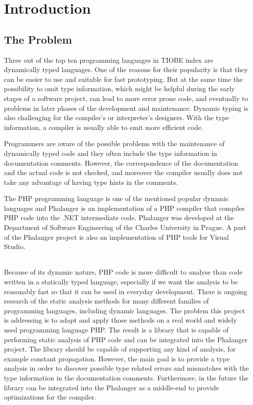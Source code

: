 \chapter{Introduction}

    \section{The Problem}
    
    Three out of the top ten programming languages in TIOBE index\cite{tiobe} 
    are dynamically typed languages. One of the reasons for their popularity 
    is that they can be easier to use and suitable for fast prototyping.
    But at the same time the possibility to omit type information, which might 
    be helpful during the early stages of a software project, can lead to more 
    error prone code, and eventually to problems in later phases of the 
    development and maintenance. Dynamic typing is also challenging for the 
    compiler's or interpreter's designers. With the type information, 
    a compiler is usually able to emit more efficient code.
    
    Programmers are aware of the possible problems with the maintenance of 
    dynamically typed code and they often include the type information in 
    documentation comments. However, the correspondence of the documentation 
    and the actual code is not checked, and moreover the compiler usually 
    does not take any advantage of having type hints in the comments.
    
    The PHP programming language is one of the mentioned popular dynamic 
    languages and Phalanger \cite{benda2006phalanger} is an implementation of a PHP compiler 
    that compiles PHP code into the .NET intermediate code. Phalanger was 
    developed at the Department of Software Engineering 
    of the Charles University in Prague. A part of the 
    Phalanger project is also an implementation of PHP tools 
    for Visual Studio.

    \subparagraph*{}    
    Because of its dynamic nature, PHP code is more difficult to analyse 
    than code written in a statically typed language, especially if we want the 
    analysis to be reasonably fast so that it can be used 
    in everyday development.  There is ongoing research of the 
    static analysis methods for many different families of programming languages, 
    including dynamic languages. The problem this project is addressing 
    is to adapt and apply those methods on a real world and widely 
    used programming language PHP. The result is a library that is capable of 
    performing static analysis of PHP code and can be integrated into 
    the Phalanger project. The library should be capable of supporting any 
    kind of analysis, for example constant propagation. However, the main goal 
    is to provide a type analysis in order to discover possible type 
    related errors and mismatches with the type information in the 
    documentation comments. Furthermore, in the future the library 
    can be integrated into the Phalanger as a middle-end to provide 
    optimizations for the compiler.

